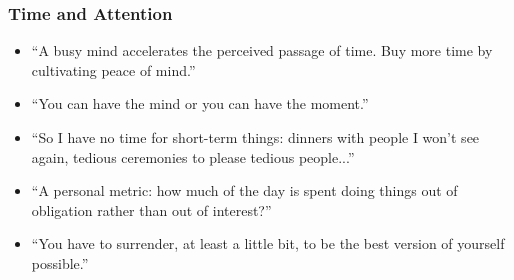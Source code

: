 \begin{frame}[fragile]\frametitle{Time and Attention}
      \begin{itemize}
        \item “A busy mind accelerates the perceived passage of time. Buy more time by cultivating peace of mind.”
        \item “You can have the mind or you can have the moment.”
        \item “So I have no time for short-term things: dinners with people I won’t see again, tedious ceremonies to please tedious people...”
        \item “A personal metric: how much of the day is spent doing things out of obligation rather than out of interest?”
        \item “You have to surrender, at least a little bit, to be the best version of yourself possible.”
      \end{itemize}
\end{frame}
